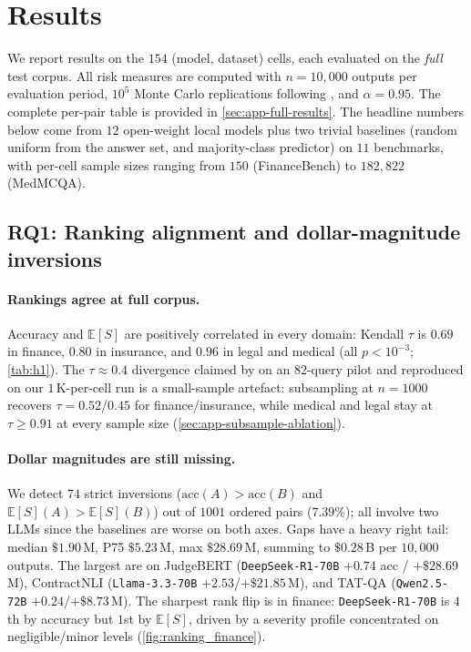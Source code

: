 \documentclass[11pt]{article}
\newcommand{\ES}{\mathbb{E}[S]}
\begin{document}

\section{Results}
\label{sec:results}

We report results on the $154$ (model, dataset) cells, each
evaluated on the \emph{full} test corpus. All risk measures are
computed with $n{=}10{,}000$ outputs per evaluation period,
$10^{5}$ Monte Carlo replications following
\citet{klugman2012loss}, and $\alpha{=}0.95$. The complete
per-pair table is provided in \autoref{sec:app-full-results}.
The headline numbers below come from $12$ open-weight local
models plus two trivial baselines (random uniform from the
answer set, and majority-class predictor) on $11$ benchmarks,
with per-cell sample sizes ranging from $150$ (FinanceBench)
to $182{,}822$ (MedMCQA).

\subsection{RQ1: Ranking alignment and dollar-magnitude inversions}
\label{sec:rq1}

\paragraph{Rankings agree at full corpus.}
Accuracy and $\ES$ are positively correlated in every domain:
Kendall $\tau$ is $0.69$ in finance, $0.80$ in insurance, and
$0.96$ in legal and medical (all $p<10^{-3}$; \autoref{tab:h1}).
The $\tau \approx 0.4$ divergence claimed by
\citet{beauchemin2026position} on an $82$-query pilot and
reproduced on our $1$\,K-per-cell run is a small-sample artefact:
subsampling at $n{=}1000$ recovers $\tau{=}0.52$/$0.45$ for
finance/insurance, while medical and legal stay at
$\tau\geq 0.91$ at every sample size
(\autoref{sec:app-subsample-ablation}).

\paragraph{Dollar magnitudes are still missing.}
We detect $74$ strict inversions ($\mathrm{acc}(A){>}\mathrm{acc}(B)$
and $\ES(A){>}\ES(B)$) out of $1001$ ordered pairs ($7.39\%$);
all involve two LLMs since the baselines are worse on both axes.
Gaps have a heavy right tail: median $\$1.90$\,M, P75
$\$5.23$\,M, max $\$28.69$\,M, summing to $\$0.28$\,B per
$10{,}000$ outputs. The largest are on JudgeBERT
(\texttt{DeepSeek-R1-70B} $+0.74$ acc / $+\$28.69$\,M),
ContractNLI (\texttt{Llama-3.3-70B} $+2.53$/$+\$21.85$\,M), and
TAT-QA (\texttt{Qwen2.5-72B} $+0.24$/$+\$8.73$\,M). The
sharpest rank flip is in finance: \texttt{DeepSeek-R1-70B} is
$4$th by accuracy but $1$st by $\ES$, driven by a severity
profile concentrated on negligible/minor levels
(\autoref{fig:ranking_finance}).
\end{document}
